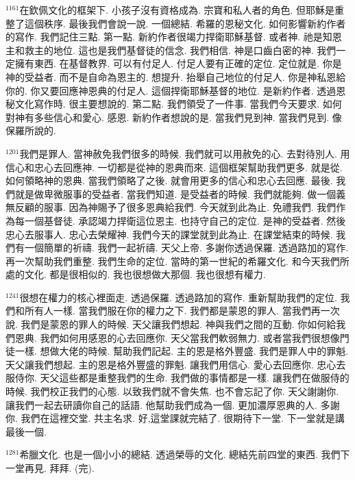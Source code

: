\documentclass{book}
\begin{document}
$^{1161}$在欽佩文化的框架下.
小孩子沒有資格成為.
宗寶和私人者的角色.
但耶穌是重整了這個秩序.
最後我們會說一說.
一個總結.
希羅的恩秘文化.
如何影響新約作者的寫作.
我們記住三點.
第一點.
新約作者很竭力捍衛耶穌基督.
或者神.
祂是知恩主和救主的地位.
這也是我們基督徒的信念.
我們相信.
神是口齒白密的神.
我們一定擁有東西.
在基督教界.
可以有付足人.
付足人要有正確的定位.
定位就是.
你是神的受益者.
而不是自命為恩主的.
想提升.
抬舉自己地位的付足人.
你是神私恩給你的.
你又要回應神恩典的付足人.
這個捍衛耶穌基督的地位.
是新約作者.
透過恩秘文化寫作時.
很主要想說的.
第二點.
我們領受了一件事.
當我們今天要求.
如何對神有多些信心和愛心.
感恩.
新約作者想說的是.
當我們見到神.
當我們見到.
像保羅所說的.

$^{1201}$我們是罪人.
當神赦免我們很多的時候.
我們就可以用赦免的心.
去對待別人.
用信心和忠心去回應神.
一切都是從神的恩典而來.
這個框架幫助我們更多.
就是從.
如何領略神的恩典.
當我們領略了之後.
就會用更多的信心和忠心去回應.
最後.
我們就是做卑微服事的受益者.
當我們知道.
是受益者的時候.
我們就能夠.
做一個義無反顧的服事.
因為神賜予了很多恩典給我們.
今天就到此為止.
免禮我們.
我們作為每一個基督徒.
承認竭力捍衛這位恩主.
也持守自己的定位.
是神的受益者.
然後忠心去服事人.
忠心去榮耀神.
我們今天的課堂就到此為止.
在課堂結束的時候.
我們有一個簡單的祈禱.
我們一起祈禱.
天父上帝.
多謝你透過保羅.
透過路加的寫作.
再一次幫助我們重整.
我們生命的定位.
當時的第一世紀的希羅文化.
和今天我們所處的文化.
都是很相似的.
我也很想做大那個.
我也很想有權力.

$^{1241}$很想在權力的核心裡面走.
透過保羅.
透過路加的寫作.
重新幫助我們的定位.
我們和所有人一樣.
當我們服在你的權力之下.
我們都是蒙恩的罪人.
當我們再一次說.
我們是蒙恩的罪人的時候.
天父讓我們想起.
神與我們之間的互動.
你如何給我們恩典.
我們如何用感恩的心去回應你.
天父當我們軟弱無力.
或者當我們很想像門徒一樣.
想做大佬的時候.
幫助我們記起.
主的恩是格外豐盛.
我們是罪人中的罪魁.
天父讓我們想起.
主的恩是格外豐盛的罪魁.
讓我們用信心.
愛心去回應你.
忠心去服侍你.
天父這些都是重整我們的生命.
我們做的事情都是一樣.
讓我們在做服侍的時候.
我們校正我們的心態.
以致我們就不會失焦.
也不會忘記了你.
天父謝謝你.
讓我們一起去研讀你自己的話語.
他幫助我們成為一個.
更加濃厚恩典的人.
多謝你.
我們在這裡交堂.
共主名求.
好,這堂課就完結了.
很期待下一堂.
下一堂就是講最後一個.

$^{1281}$希臘文化.
也是一個小小的總結.
透過榮辱的文化.
總結先前四堂的東西.
我們下一堂再見.
拜拜.
(完).
\newpage
\end{document}
